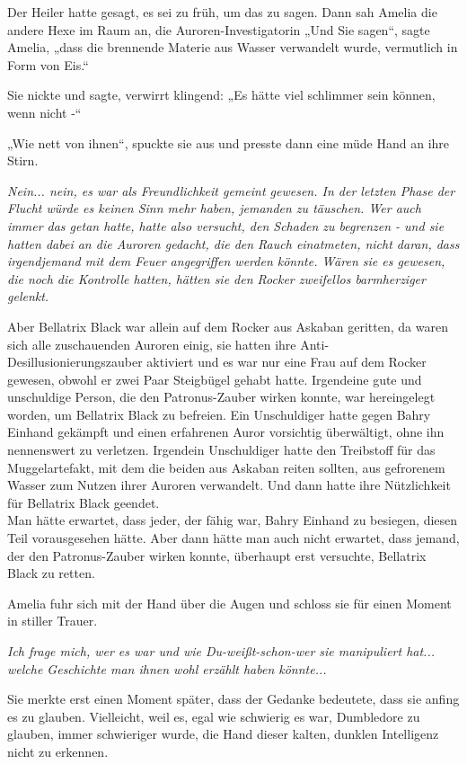{Der Heiler hatte gesagt, es sei zu früh, um das zu sagen. Dann sah Amelia die andere Hexe im Raum an, die Auroren-Investigatorin „Und Sie sagen“, sagte Amelia, „dass die brennende Materie aus Wasser verwandelt wurde, vermutlich in Form von Eis.“

Sie nickte und sagte, verwirrt klingend: „Es hätte viel schlimmer sein können, wenn nicht -“

„Wie nett von ihnen“, spuckte sie aus und presste dann eine müde Hand an ihre Stirn.

\emph{Nein... nein, es war als Freundlichkeit gemeint gewesen. In der letzten Phase der Flucht würde es keinen Sinn mehr haben, jemanden zu täuschen. Wer auch immer das getan hatte, hatte also versucht, den Schaden zu begrenzen - und sie hatten dabei an die Auroren gedacht, die den Rauch einatmeten, nicht daran, dass irgendjemand mit dem Feuer angegriffen werden könnte. Wären sie es gewesen, die noch die Kontrolle hatten, hätten sie den Rocker zweifellos barmherziger gelenkt.}

Aber Bellatrix Black war allein auf dem Rocker aus Askaban geritten, da waren sich alle zuschauenden Auroren einig, sie hatten ihre Anti-Desillusionierungszauber aktiviert und es war nur eine Frau auf dem Rocker gewesen, obwohl er zwei Paar Steigbügel gehabt hatte. Irgendeine gute und unschuldige Person, die den Patronus-Zauber wirken konnte, war hereingelegt worden, um Bellatrix Black zu befreien. Ein Unschuldiger hatte gegen Bahry Einhand gekämpft und einen erfahrenen Auror vorsichtig überwältigt, ohne ihn nennenswert zu verletzen. Irgendein Unschuldiger hatte den Treibstoff für das Muggelartefakt, mit dem die beiden aus Askaban reiten sollten, aus gefrorenem Wasser zum Nutzen ihrer Auroren verwandelt. Und dann hatte ihre Nützlichkeit für Bellatrix Black geendet.\\ Man hätte erwartet, dass jeder, der fähig war, Bahry Einhand zu besiegen, diesen Teil vorausgesehen hätte. Aber dann hätte man auch nicht erwartet, dass jemand, der den Patronus-Zauber wirken konnte, überhaupt erst versuchte, Bellatrix Black zu retten.

Amelia fuhr sich mit der Hand über die Augen und schloss sie für einen Moment in stiller Trauer.

\emph{Ich frage mich, wer es war und wie Du-weißt-schon-wer sie manipuliert hat... welche Geschichte man ihnen wohl erzählt haben könnte...}

Sie merkte erst einen Moment später, dass der Gedanke bedeutete, dass sie anfing es zu glauben. Vielleicht, weil es, egal wie schwierig es war, Dumbledore zu glauben, immer schwieriger wurde, die Hand dieser kalten, dunklen Intelligenz nicht zu erkennen.

}
